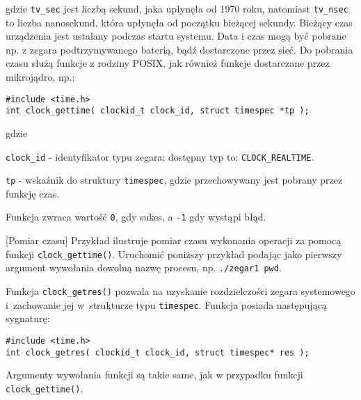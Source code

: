 \noindent 
gdzie \lstinline[style=MyCStyle]{tv_sec} jest liczbą sekund, jaka upłynęła od 1970 roku, natomiast \lstinline[style=MyCStyle]{tv_nsec} to liczba nanosekund, która upłynęła od początku bieżącej sekundy. Bieżący czas urządzenia jest ustalany podczas startu systemu. Data i czas mogą być pobrane np. z zegara podtrzymywanego baterią, bądź dostarczone przez sieć. Do pobrania czasu służą funkcje z rodziny POSIX, jak również funkcje dostarczane przez mikrojądro, np.:

\begin{lstlisting}[style=MyCStyle]
#include <time.h>
int clock_gettime( clockid_t clock_id, struct timespec *tp );
\end{lstlisting}

\noindent 
gdzie 

\begin{myitemize}
\item[] \lstinline[style=MyCStyle]{clock_id} - identyfikator typu zegara; dostępny typ to: \lstinline[style=MyCStyle]{CLOCK_REALTIME}.
\item[] \lstinline[style=MyCStyle]{tp} - wskaźnik do struktury \lstinline[style=MyCStyle]{timespec}, gdzie przechowywany jest pobrany przez funkcję czas.
\end{myitemize}

Funkcja zwraca wartość \lstinline[style=MyCStyle]{0}, gdy sukes, a \lstinline[style=MyCStyle]{-1} gdy wystąpi błąd.


\begin{example}{[Pomiar czasu]} Przykład ilustruje pomiar czasu wykonania operacji  za pomocą funkcji \lstinline[style=MyCStyle]{clock_gettime()}. Uruchomić poniższy przykład podając jako pierwszy argument wywołania dowolną nazwę procesu, np. \lstinline[style=MyCStyle]{./zegar1 pwd}.

\end{example} 

Funkcja \lstinline[style=MyCStyle]{clock_getres()} pozwala na uzyskanie rozdzielczości zegara systemowego i~zachowanie jej w~strukturze typu \lstinline[style=MyCStyle]{timespec}. Funkcja posiada następującą sygnaturę: 

\begin{lstlisting}[style=MyCStyle]
#include <time.h>
int clock_getres( clockid_t clock_id, struct timespec* res );
\end{lstlisting}

Argumenty wywołania funkcji są takie same, jak w przypadku funkcji \lstinline[style=MyCStyle]{clock_gettime()}. 

